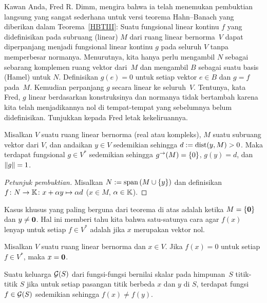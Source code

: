 \begin{exer} Kawan Anda, Fred R. Dimm, mengira bahwa ia telah menemukan pembuktian langsung yang sangat sederhana untuk
versi teorema Hahn--Banach yang diberikan dalam Teorema~\ref{HBTIII}: Suatu fungsional
linear kontinu $f$ yang didefinisikan pada subruang (linear) $M$ dari ruang linear bernorma~$V$ dapat
diperpanjang menjadi fungsional linear kontinu $g$ pada seluruh $V$ tanpa memperbesar
normanya. Menurutnya, kita hanya perlu mengambil $N$ sebagai sebarang komplemen ruang vektor
dari~$M$ dan mengambil $B$ sebagai suatu basis (Hamel) untuk $N$. Definisikan $g(e) = 0$ untuk setiap vektor $e
\in B$ dan $g = f$ pada~$M$. Kemudian perpanjang $g$ secara linear ke seluruh~$V$. Tentunya, kata Fred, $g$ linear berdasarkan konstruksinya dan normanya tidak bertambah karena kita
telah menjadikannya nol di tempat-tempat yang sebelumnya belum didefinisikan. Tunjukkan kepada Fred letak kekeliruannya.
\end{exer}

\begin{thm}\label{HBTIV} Misalkan $V$ suatu ruang linear bernorma (real atau kompleks),
$M$ suatu subruang vektor dari $V$, dan andaikan $y \in V$ sedemikian sehingga
$d := \operatorname{dist}(y,M) > 0$. Maka terdapat fungsional $g \in V^*$ sedemikian sehingga $g^{\rightarrow}(M) = \{0\}$,
$g(y) = d$, dan $\lVert g\rVert = 1$.
\end{thm}

\begin{proof}[\emph{Petunjuk pembuktian}] Misalkan $N := \operatorname{span}{(M \cup \{y\})}$ dan definisikan
$f\colon N \rightarrow \mathbb{K} \colon x + \alpha y \mapsto \alpha d$ ($x \in M$, $\alpha \in \mathbb{K}$). \ns
\end{proof}

Kasus khusus yang paling berguna dari teorema di atas adalah ketika $M = \{\mathbf{0}\}$ dan $y \ne \mathbf{0}$.
Hal ini memberi tahu kita bahwa satu-satunya cara agar $f(x)$ lenyap untuk setiap $f \in V^*$ adalah jika $x$
merupakan vektor nol.

\begin{cor}\label{HBCorI} Misalkan $V$ suatu ruang linear bernorma dan $x \in V$. Jika $f(x) = 0$ untuk
setiap $f \in V^*$, maka $x = \mathbf{0}$.
\end{cor}

\begin{defn} Suatu keluarga $\mathcal{G}(S)$ dari fungsi-fungsi bernilai skalar pada himpunan~$S$
 titik-titik $S$ jika untuk setiap pasangan titik berbeda $x$ dan $y$ di $S$, terdapat
fungsi $f \in \mathcal{G}(S)$ sedemikian sehingga $f(x) \ne f(y)$.
\end{defn}

